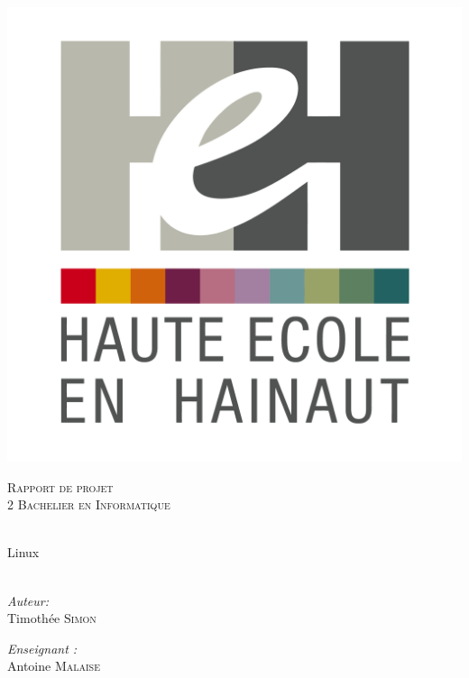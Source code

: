 \begin{center}
  \includegraphics[scale=0.12]{textures/logo/heh.pdf}

  \vspace{1cm}

  \textsc{\LARGE Rapport de projet} \\ [1cm]

  \textsc{\large 2 Bachelier en Informatique} \\ [0.2cm]

  \begingroup
   \selectfont 

  \HRule \\ [0.4cm] {
    \huge Linux \\ [0.2cm] 
  }
  \HRule \\ [1.3cm]
  \endgroup

  \begin{minipage}[t]{0.4 \textwidth} 
    \begin{flushleft} 
      \large \emph{Auteur:} \\ 
      Timothée \textsc{Simon}
    \end{flushleft} 
  \end{minipage}
  \begin{minipage}[t]{0.4 \textwidth}
    \begin{flushright} 
      \large \emph{Enseignant :} \\ 
      Antoine \textsc{Malaise}
    \end{flushright} 
  \end{minipage}


\end{center}
